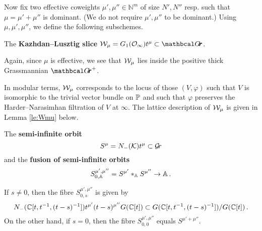 \documentclass[draft]{article}
\begin{document}

Now fix two effective coweights $ \mu', \mu'' \in \mathbb N^m$ of size $N',N''$ resp. such that $ \mu = \mu' + \mu'' $ is dominant. (We do not require $ \mu', \mu'' $ to be dominant.) 
Using $ \mu, \mu', \mu''$, we define the following subschemes.

\begin{definition}
    The \textbf{Kazhdan--Lusztig slice} $\cW_\mu = G_1(\Oinf) t^\mu \subset \Grth $.  
\end{definition}
Again, since $\mu $ is effective, we see that $ \cW_\mu $ lies inside the positive thick Grassmannian $ \Grth^+$.
% 

In modular terms, $\cW_\mu$ corresponds to the locus of those $ (V, \varphi)$ such that $ V $ is isomorphic to the trivial vector bundle on $ \PP$ and such that $ \varphi$ preserves the {Harder--Narasimhan filtration of $V$ at $ \infty$}.  The lattice description of $ \cW_\mu $ is given in Lemma \ref{le:Wmu} below. 
% 
\begin{definition} The \textbf{semi-infinite orbit} 
$$ S^\mu = N_-(\cK)t^\mu \subset \Gr $$ 
and the \textbf{fusion of  semi-infinite orbits} 
$$ S^{\mu', \mu''}_{0,\AA} = S^{\mu'} \ast_\AA S^{\mu''} \to \AA \,.$$  
\end{definition}
If $ s \ne 0 $, then the fibre $S^{\mu', \mu''}_{0,s} $ is given by
$$
N_-(\CC[t, t^{-1}, (t-s)^{-1}])t^{\mu'} (t-s)^{\mu''} G(\CC[t])\subset G(\CC[t,t^{-1}, (t-s)^{-1}]) / G(\CC[t]) \,. %
$$
On the other hand, if $ s = 0$, then the fibre $S^{\mu', \mu''}_{0,0} $ equals $ S^{\mu' + \mu''}$. 
% 
    
\end{document}
